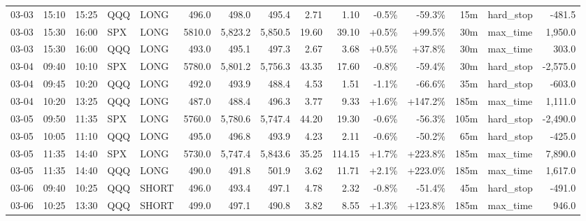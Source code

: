 \documentclass[11pt,a4paper,twoside]{article}
\begin{document}
\begin{landscape}
\begin{center}
\begin{longtable}{>{\color{txtmain}}l l l l l r r r r r r r r >{\color{txtmain}}l r}
03-03 & 15:10 & 15:25 & QQQ & LONG & 496.0 & 498.0 & 495.4 & 2.71 & 1.10 & \textcolor{lossred}{-0.5\%} & \textcolor{lossred}{-59.3\%} & 15m & hard\_stop & \textcolor{lossred}{-481.5} \\
03-03 & 15:30 & 16:00 & SPX & LONG & 5810.0 & 5,823.2 & 5,850.5 & 19.60 & 39.10 & \textcolor{wingreen}{+0.5\%} & \textcolor{wingreen}{+99.5\%} & 30m & max\_time & \textcolor{wingreen}{1,950.0} \\
03-03 & 15:30 & 16:00 & QQQ & LONG & 493.0 & 495.1 & 497.3 & 2.67 & 3.68 & \textcolor{wingreen}{+0.5\%} & \textcolor{wingreen}{+37.8\%} & 30m & max\_time & \textcolor{wingreen}{303.0} \\
03-04 & 09:40 & 10:10 & SPX & LONG & 5780.0 & 5,801.2 & 5,756.3 & 43.35 & 17.60 & \textcolor{lossred}{-0.8\%} & \textcolor{lossred}{-59.4\%} & 30m & hard\_stop & \textcolor{lossred}{-2,575.0} \\
03-04 & 09:45 & 10:20 & QQQ & LONG & 492.0 & 493.9 & 488.4 & 4.53 & 1.51 & \textcolor{lossred}{-1.1\%} & \textcolor{lossred}{-66.6\%} & 35m & hard\_stop & \textcolor{lossred}{-603.0} \\
03-04 & 10:20 & 13:25 & QQQ & LONG & 487.0 & 488.4 & 496.3 & 3.77 & 9.33 & \textcolor{wingreen}{+1.6\%} & \textcolor{wingreen}{+147.2\%} & 185m & max\_time & \textcolor{wingreen}{1,111.0} \\
03-05 & 09:50 & 11:35 & SPX & LONG & 5760.0 & 5,780.6 & 5,747.4 & 44.20 & 19.30 & \textcolor{lossred}{-0.6\%} & \textcolor{lossred}{-56.3\%} & 105m & hard\_stop & \textcolor{lossred}{-2,490.0} \\
03-05 & 10:05 & 11:10 & QQQ & LONG & 495.0 & 496.8 & 493.9 & 4.23 & 2.11 & \textcolor{lossred}{-0.6\%} & \textcolor{lossred}{-50.2\%} & 65m & hard\_stop & \textcolor{lossred}{-425.0} \\
03-05 & 11:35 & 14:40 & SPX & LONG & 5730.0 & 5,747.4 & 5,843.6 & 35.25 & 114.15 & \textcolor{wingreen}{+1.7\%} & \textcolor{wingreen}{+223.8\%} & 185m & max\_time & \textcolor{wingreen}{7,890.0} \\
03-05 & 11:35 & 14:40 & QQQ & LONG & 490.0 & 491.8 & 501.9 & 3.62 & 11.71 & \textcolor{wingreen}{+2.1\%} & \textcolor{wingreen}{+223.0\%} & 185m & max\_time & \textcolor{wingreen}{1,617.0} \\
03-06 & 09:40 & 10:25 & QQQ & SHORT & 496.0 & 493.4 & 497.1 & 4.78 & 2.32 & \textcolor{lossred}{-0.8\%} & \textcolor{lossred}{-51.4\%} & 45m & hard\_stop & \textcolor{lossred}{-491.0} \\
03-06 & 10:25 & 13:30 & QQQ & SHORT & 499.0 & 497.1 & 490.8 & 3.82 & 8.55 & \textcolor{wingreen}{+1.3\%} & \textcolor{wingreen}{+123.8\%} & 185m & max\_time & \textcolor{wingreen}{946.0} \\

\end{longtable}
\end{center}
\end{landscape}
\end{document}
